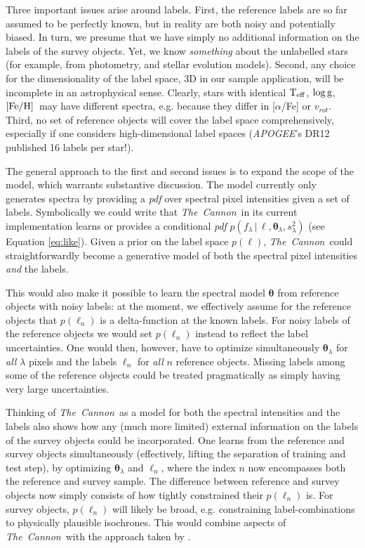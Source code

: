 \documentclass[12pt, preprint]{aastex}
\newcommand{\tc}{\textsl{The~Cannon}}
\newcommand{\apogee}{\textsl{APOGEE}}
\newcommand{\set}[1]{\bm{#1}}
\newcommand{\starlabel}{\ell}
\newcommand{\starlabelvec}{\set{\starlabel}}
\newcommand{\given}{\,|\,}
\newcommand{\teff}{\mbox{$\rm T_{eff}$}}
\newcommand{\feh}{\mbox{$\rm [Fe/H]$}}
\newcommand{\logg}{\mbox{$\rm \log g$}}
\begin{document}
Three important issues arise around labels. First, the reference labels are so far assumed to be perfectly known, 
but in reality are both noisy and potentially biased. In turn, we presume that we
have simply no additional information on the labels of the survey objects. Yet,
we know \emph{something} about the unlabelled stars (for example, from
photometry, and stellar evolution models). Second, any choice for the dimensionality of the label space, 3D in our sample application, will be incomplete in an astrophysical sense. Clearly, stars with identical \teff, \logg, \feh\ may have different spectra, e.g.
because they differ in [$\alpha$/Fe] or $v_{rot}$.
Third, no set of reference objects will cover the label
space comprehensively, especially if one considers high-dimensional label spaces (\apogee 's DR12
published 16 labels per star!). 

The general approach to the first and second issues is to expand the scope of the model, which warrants substantive discussion. The model currently only generates spectra by providing a \textit{pdf}
over spectral pixel intensities given a set of labels.
Symbolically we could write that \tc\ in its current implementation
learns or provides a conditional \textit{pdf}
$p(f_\lambda\given\starlabelvec,\set{\theta}_\lambda, s_\lambda^2)$ (see Equation \ref{eq:like}).
Given a prior on the label space
$p(\starlabelvec)$, \tc\ could straightforwardly become a generative model of both
the spectral pixel intensities \emph{and} the labels.

This would also make it possible to learn the spectral model $\set{\theta}$ from
reference objects with noisy labels: at the moment, we effectively 
assume for the reference objects that $p(\starlabelvec_n)$ is a delta-function 
at the known labels. For noisy labels of the reference objects 
we would set $p(\starlabelvec_n)$ instead to reflect the label uncertainties. 
One would then, however, have to optimize simultaneously
$\set{\theta}_\lambda$ for \textit{all} $\lambda$ pixels and the labels $\starlabelvec_n$
for \textit{all} $n$ reference objects. Missing labels among some of the reference
objects could be treated pragmatically as simply having very large uncertainties.

Thinking of \tc\ as a model for both the spectral intensities and the labels
also shows how any (much more limited) external information on the labels of the survey
objects could be incorporated. One learns from the reference and survey objects
simultaneously (effectively, lifting the separation of training and test step),
by optimizing $\set{\theta}_\lambda$ and $\starlabelvec_n$, where the index $n$ now 
encompasses both the reference and survey sample. The difference between reference and survey objects
now simply consists of how tightly constrained their $p(\starlabelvec_n)$ is. 
For survey objects, $p(\starlabelvec_n)$ will likely be broad, e.g. constraining label-combinations
to physically plausible isochrones. This would combine aspects of \tc\ with the approach
taken by \cite{SB2014}.
\end{document}
